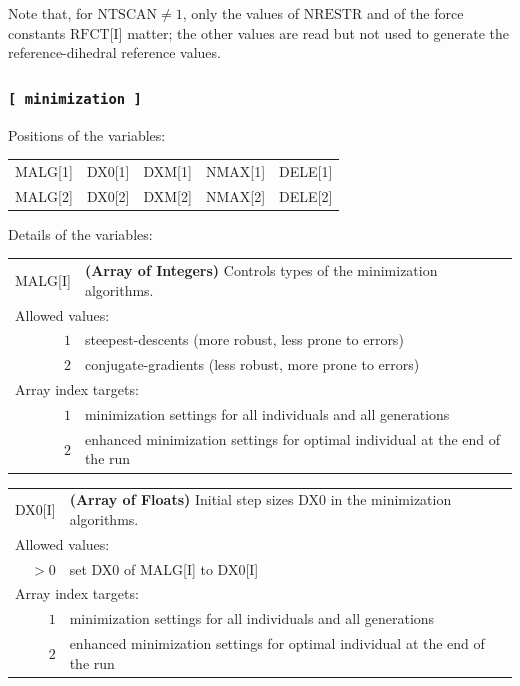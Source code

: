 \documentclass[10pt,a4paper,openany]{memoir}
\numberwithin{equation}{section}
\begin{document}
Note that, for $\text{NTSCAN} \neq 1$, only the values of
$\text{NRESTR}$ and of the force constants $\text{RFCT[I]}$ matter;
the other values are read but not used to generate the
reference-dihedral reference values.

\subsubsection{\texttt{[~minimization~]}}
\label{sec:inp-minimization}


\noindent Positions of the variables:
\begin{center}
  \begin{tabular}{lllll}
    MALG[1] & DX0[1] & DXM[1] & NMAX[1] & DELE[1] \\
    MALG[2] & DX0[2] & DXM[2] & NMAX[2] & DELE[2] \\
  \end{tabular}
\end{center}

\noindent Details of the variables:
\vspace{2ex}

{
\begin{tabular}{r@{ : }l}
\label{descr:malg}
      MALG[I]&\textbf{(Array of Integers)} Controls types of the minimization algorithms.                                                                             \\ 
\multicolumn{2}{l}{Allowed values:} \\ 
     \(1\)&steepest-descents (more robust, less prone to errors)                                                                                    \\ 
     \(2\)&conjugate-gradients (less robust, more prone to errors)                                                                                  \\ 
\multicolumn{2}{l}{Array index targets:} \\ 
     \(1\)&minimization settings for all individuals and all generations \\
     \(2\)&enhanced minimization settings for optimal individual at the end of the run \\
\end{tabular}
\vspace{1ex}
}

{
\begin{tabular}{r@{ : }l}
\label{descr:dx0}
       DX0[I]&\textbf{(Array of Floats)} Initial step sizes DX0 in the minimization algorithms.                                               \\ 
\multicolumn{2}{l}{Allowed values:} \\ 
    \(>0\)&set DX0 of MALG[I] to DX0[I]                                                                         \\ 
\multicolumn{2}{l}{Array index targets:} \\ 
     \(1\)&minimization settings for all individuals and all generations \\
     \(2\)&enhanced minimization settings for optimal individual at the end of the run \\
\end{tabular}
\vspace{1ex}
}
\end{document}
